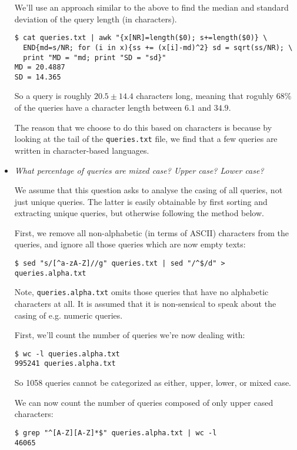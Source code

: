 \begin{itemize}
We'll use an approach similar to the above to find the median and standard
deviation of the query length (in characters).

\begin{lstlisting}
$ cat queries.txt | awk "{x[NR]=length($0); s+=length($0)} \
  END{md=s/NR; for (i in x){ss += (x[i]-md)^2} sd = sqrt(ss/NR); \
  print "MD = "md; print "SD = "sd}"
MD = 20.4887
SD = 14.365
\end{lstlisting}

So a query is roughly $20.5\pm 14.4$ characters long, meaning that roguhly 68\%
of the queries have a character length between $6.1$ and $34.9$.

The reason that we choose to do this based on characters is because by looking
at the tail of the \texttt{queries.txt} file, we find that a few queries are
written in character-based languages. 

\item \emph{What percentage of queries are mixed case? Upper case? Lower case?}

We assume that this question asks to analyse the casing of all queries, not
just unique queries. The latter is easily obtainable by first sorting and
extracting unique queries, but otherwise following the method below.

First, we remove all non-alphabetic (in terms of ASCII) characters from the
queries, and ignore all those queries which are now empty texts:

\begin{lstlisting}
$ sed "s/[^a-zA-Z]//g" queries.txt | sed "/^$/d" > queries.alpha.txt
\end{lstlisting}

Note, \texttt{queries.alpha.txt} omits those queries that have no alphabetic
characters at all. It is assumed that it is non-sensical to speak about the
casing of e.g. numeric queries.

First, we'll count the number of queries we're now dealing with:

\begin{lstlisting}
$ wc -l queries.alpha.txt 
995241 queries.alpha.txt
\end{lstlisting}

So 1058 queries cannot be categorized as either, upper, lower, or mixed case.

We can now count the number of queries composed of only upper cased characters:

\begin{lstlisting}
$ grep "^[A-Z][A-Z]*$" queries.alpha.txt | wc -l
46065
\end{lstlisting}


\end{itemize}

